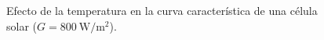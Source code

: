 %
\begin{figure}
\begin{centering}
\par\end{centering}

\begin{centering}
\end{centering}

\caption{Efecto de la temperatura en la curva característica de una célula
solar ($G=\SI{800}{\watt\per\meter\squared}$).\label{fig:EfectoTemperaturaUNED}}

\end{figure}




